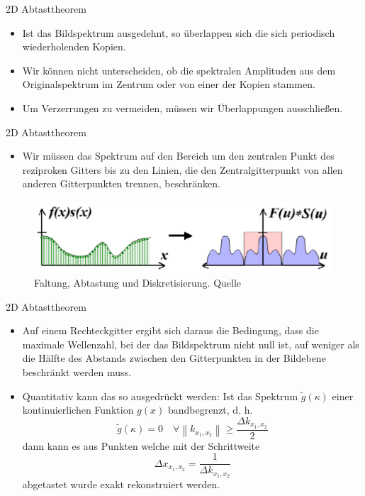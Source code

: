 \documentclass{beamer}
\begin{document}
	\begin{frame}{2D Abtasttheorem}
	\begin{itemize}
		\item Ist das Bildspektrum ausgedehnt, so überlappen sich die sich periodisch wiederholenden Kopien.
		\item Wir können nicht unterscheiden, ob die spektralen Amplituden aus dem Originalspektrum im Zentrum oder von einer der Kopien stammen.
		\item  Um Verzerrungen zu vermeiden, müssen wir Überlappungen ausschließen.
	\end{itemize}
	\end{frame}

	\begin{frame}{2D Abtasttheorem}
	\begin{itemize}
		\item Wir müssen das Spektrum auf den Bereich um den zentralen Punkt des reziproken Gitters bis zu den Linien, die den Zentralgitterpunkt von allen anderen Gitterpunkten trennen, beschränken.
	\end{itemize}
	\begin{figure}
		\includegraphics[width=1.3\textheight]{increase.pdf}
		\caption{\footnotesize Faltung, Abtastung und Diskretisierung. Quelle\cite{mit}}
	\end{figure}
	\end{frame}

	\begin{frame}{2D Abtasttheorem}
	\begin{itemize}
		\item Auf einem Rechteckgitter ergibt sich daraus die Bedingung, dass die maximale Wellenzahl, bei der das Bildspektrum nicht null ist,
		auf weniger als die Hälfte des Abstands zwischen den Gitterpunkten in der Bildebene beschränkt werden muss.
		\item Quantitativ kann das so ausgedrückt werden: Ist das Spektrum $\tilde{g}(\kappa)$ einer kontinuierlichen Funktion $g(x)$ bandbegrenzt, d. h.
		$$\tilde{g}(\kappa) = 0 \hspace{1em} \forall \left\|k_{x_1,x_2}\right\|\ge \frac{\Delta k_{x_1,x_2}}{2} $$
		dann kann es aus Punkten welche mit der Schrittweite
		$$\Delta x_{x_1,x_2} = \frac{1}{\Delta k_{x_1,x_2}} $$
		abgetastet wurde exakt rekonstruiert werden.\cite{bildverarbeitung}
	\end{itemize}
	\end{frame}
\end{document}
